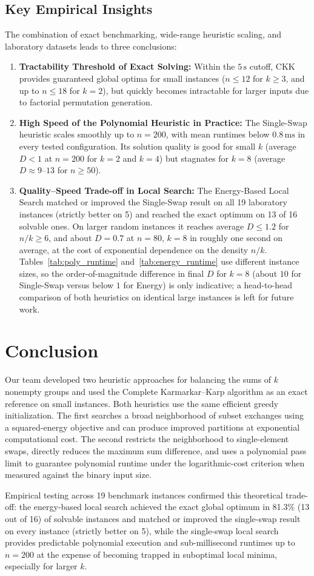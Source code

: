 \documentclass[11pt,a4paper]{article}
\begin{document}
\subsection{Key Empirical Insights}
The combination of exact benchmarking, wide-range heuristic scaling, and laboratory datasets leads to three conclusions:
\begin{enumerate}
\item \textbf{Tractability Threshold of Exact Solving:} Within the $5\,\text{s}$ cutoff, CKK provides guaranteed global optima for small instances ($n \le 12$ for $k \ge 3$, and up to $n \le 18$ for $k=2$), but quickly becomes intractable for larger inputs due to factorial permutation generation.
\item \textbf{High Speed of the Polynomial Heuristic in Practice:} The Single-Swap heuristic scales smoothly up to $n=200$, with mean runtimes below $0.8\,\text{ms}$ in every tested configuration. Its solution quality is good for small $k$ (average $D<1$ at $n=200$ for $k=2$ and $k=4$) but stagnates for $k=8$ (average $D\approx 9$--$13$ for $n\ge 50$).
\item \textbf{Quality--Speed Trade-off in Local Search:} The Energy-Based Local Search matched or improved the Single-Swap result on all 19 laboratory instances (strictly better on 5) and reached the exact optimum on 13 of 16 solvable ones. On larger random instances it reaches average $D\le 1.2$ for $n/k\ge 6$, and about $D=0.7$ at $n=80$, $k=8$ in roughly one second on average, at the cost of exponential dependence on the density $n/k$. Tables~\ref{tab:poly_runtime} and~\ref{tab:energy_runtime} use different instance sizes, so the order-of-magnitude difference in final $D$ for $k=8$ (about $10$ for Single-Swap versus below $1$ for Energy) is only indicative; a head-to-head comparison of both heuristics on identical large instances is left for future work.
\end{enumerate}

\section{Conclusion}
Our team developed two heuristic approaches for balancing the sums of $k$ nonempty groups and used the Complete Karmarkar--Karp algorithm as an exact reference on small instances. Both heuristics use the same efficient greedy initialization. The first searches a broad neighborhood of subset exchanges using a squared-energy objective and can produce improved partitions at exponential computational cost. The second restricts the neighborhood to single-element swaps, directly reduces the maximum sum difference, and uses a polynomial pass limit to guarantee polynomial runtime under the logarithmic-cost criterion when measured against the binary input size.

Empirical testing across 19 benchmark instances confirmed this theoretical trade-off: the energy-based local search achieved the exact global optimum in 81.3\% (13 out of 16) of solvable instances and matched or improved the single-swap result on every instance (strictly better on 5), while the single-swap local search provides predictable polynomial execution and sub-millisecond runtimes up to $n=200$ at the expense of becoming trapped in suboptimal local minima, especially for larger $k$.
\end{document}
